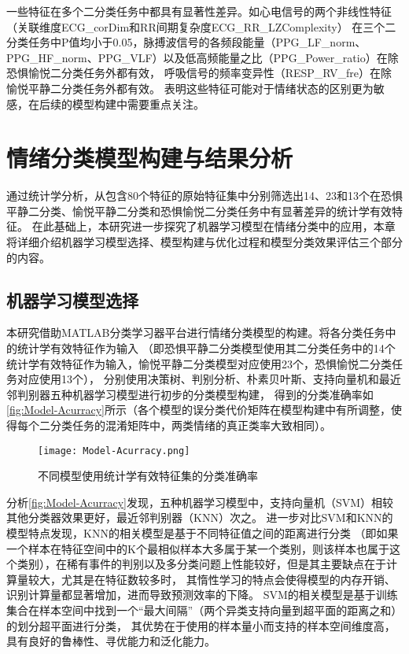 一些特征在多个二分类任务中都具有显著性差异。如心电信号的两个非线性特征（关联维度ECG\_corDim和RR间期复杂度ECG\_RR\_LZComplexity）
在三个二分类任务中P值均小于0.05，脉搏波信号的各频段能量（PPG\_LF\_norm、PPG\_HF\_norm、PPG\_VLF）以及低高频能量之比（PPG\_Power\_ratio）在除恐惧愉悦二分类任务外都有效，
呼吸信号的频率变异性（RESP\_RV\_fre）在除愉悦平静二分类任务外都有效。
表明这些特征可能对于情绪状态的区别更为敏感，在后续的模型构建中需要重点关注。


\clearpage
\section{情绪分类模型构建与结果分析}
通过统计学分析，从包含80个特征的原始特征集中分别筛选出14、23和13个在恐惧平静二分类、愉悦平静二分类和恐惧愉悦二分类任务中有显著差异的统计学有效特征。
在此基础上，本研究进一步探究了机器学习模型在情绪分类中的应用，本章将详细介绍机器学习模型选择、模型构建与优化过程和模型分类效果评估三个部分的内容。

\subsection{机器学习模型选择}
\raggedbottom
本研究借助MATLAB分类学习器平台进行情绪分类模型的构建。将各分类任务中的统计学有效特征作为输入
（即恐惧平静二分类模型使用其二分类任务中的14个统计学有效特征作为输入，愉悦平静二分类模型对应使用23个，恐惧愉悦二分类任务对应使用13个），
分别使用决策树、判别分析、朴素贝叶斯、支持向量机和最近邻判别器五种机器学习模型进行初步的分类模型构建，
得到的分类准确率如\autoref{fig:Model-Acurracy}所示（各个模型的误分类代价矩阵在模型构建中有所调整，使得每个二分类任务的混淆矩阵中，两类情绪的真正类率大致相同）。
\begin{figure}[htbp]
    \centering
    \texttt{[image: Model-Acurracy.png]}
    \caption[不同模型使用统计学有效特征集的分类准确率]{不同模型使用统计学有效特征集的分类准确率}
    \label{fig:Model-Acurracy}
\end{figure}

分析\autoref{fig:Model-Acurracy}发现，五种机器学习模型中，支持向量机（SVM）相较其他分类器效果更好，最近邻判别器（KNN）次之。
进一步对比SVM和KNN的模型特点发现，KNN的相关模型是基于不同特征值之间的距离进行分类
（即如果一个样本在特征空间中的K个最相似样本大多属于某一个类别，则该样本也属于这个类别），在稀有事件的判别以及多分类问题上性能较好，但是其主要缺点在于计算量较大，尤其是在特征数较多时，
其惰性学习的特点会使得模型的内存开销、识别计算量都显著增加，进而导致预测效率的下降。
SVM的相关模型是基于训练集合在样本空间中找到一个“最大间隔”（两个异类支持向量到超平面的距离之和）的划分超平面进行分类，
其优势在于使用的样本量小而支持的样本空间维度高，具有良好的鲁棒性、寻优能力和泛化能力。

